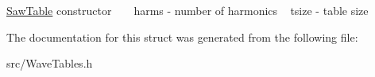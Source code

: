 \hyperlink{struct_saw_table}{Saw\+Table} constructor ~\newline
~\newline
harms -\/ number of harmonics ~\newline
tsize -\/ table size ~\newline


The documentation for this struct was generated from the following file\+:\begin{DoxyCompactItemize}
\item 
src/Wave\+Tables.\+h\end{DoxyCompactItemize}
